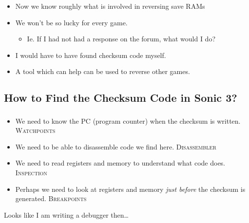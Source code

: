 \documentclass{beamer}
\begin{document}
\begin{frame}[fragile]
\frametitle{\insertsubsection}


\vfill
\begin{itemize}
\item Now we know roughly what is involved in reversing save RAMs
\vfill
\item We won't be so lucky for every game.
\begin{itemize}
\item Ie. If I had not had a response on the forum, what would I do?
\end{itemize}
\vfill
\item I would have to have found checksum code myself.
\vfill
\item A tool which can help can be used to reverse other games.
\end{itemize}

\vfill

\end{frame}


\subsection{How to Find the Checksum Code in Sonic 3?}

\begin{frame}[fragile]
\frametitle{\insertsubsection}

\begin{itemize}
\item We need to know the PC (program counter) when the checksum is written. \textsc{Watchpoints}
\vfill
\item We need to be able to disassemble code we find here. \textsc{Disassembler}
\vfill
\item We need to read registers and memory to understand what code does. \textsc{Inspection}
\vfill
\item Perhaps we need to look at registers and memory \emph{just before} the checksum is generated. \textsc{Breakpoints}
\end{itemize}

\pause

\begin{center}
Looks like I am writing a debugger then\ldots
\end{center}

\end{frame}

\end{document}
